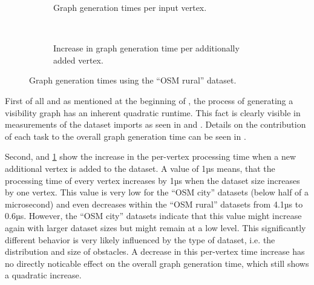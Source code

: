 \begin{figure}[h!]
\begin{minipage}{.48\textwidth}
\begin{subfigure}[t]{\linewidth}
						\caption{Graph generation times per input vertex.}
					\end{subfigure}
					\\[3ex]
					\begin{subfigure}[t]{\linewidth}
						\begin{figcenter}
							
						\end{figcenter}
						\caption{Increase in graph generation time per additionally added vertex.}
						\label{fig:eval-import-rural-rel-increase}
					\end{subfigure}
					\caption{Graph generation times using the \enquote{OSM rural} dataset.}
					\label{fig:eval-import-rural}
				\end{minipage}
			\end{figure}
			
			First of all and as mentioned at the beginning of , the process of generating a visibility graph has an inherent quadratic runtime.
			This fact is clearly visible in measurements of the dataset imports as seen in  and .
			Details on the contribution of each task to the overall graph generation time can be seen in .
			
			Second,  and \ref{fig:eval-import-rural-rel-increase} show the increase in the per-vertex processing time when a new additional vertex is added to the dataset.
			A value of 1µs means, that the processing time of every vertex increases by 1µs when the dataset size increases by one vertex.
			This value is very low for the \enquote{OSM city} datasets (below half of a microsecond) and even decreases within the \enquote{OSM rural} datasets from 4.1µs to 0.6µs.
			However, the \enquote{OSM city} datasets indicate that this value might increase again with larger dataset sizes but might remain at a low level.
			This significantly different behavior is very likely influenced by the type of dataset, i.e. the distribution and size of obstacles.
			A decrease in this per-vertex time increase has no directly noticable effect on the overall graph generation time, which still shows a quadratic increase.
			
